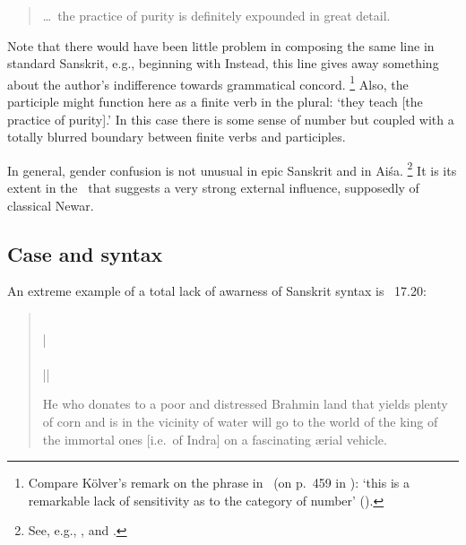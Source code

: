 \begin{quote}

\dots\ the practice of purity is definitely expounded in great detail.
\end{quote}

\noindent
Note that there would have been little problem in composing the same
line in standard Sanskrit, e.g., beginning with 
Instead, this line gives away something about the author's indifference
towards grammatical concord.%
		\footnote{Compare Kölver's remark on the phrase 
		in \SvayP\ (on p.~459 in ):
		`this is a remarkable lack of sensitivity as to the category of number'
		().}
Also, the participle  might
function here as a finite verb in the plural: `they teach [the practice of purity].'
In this case there is some sense of number but coupled with a totally 
blurred boundary between finite verbs and participles.


In general, gender confusion is not unusual in epic Sanskrit and in Aiśa.%
		\footnote{See, e.g., , and
									.}
It is its extent in the \VSS\ that suggests a very strong external influence,
supposedly of classical Newar.									





\subsection{Case and syntax}

An extreme example of a total lack of awarness of Sanskrit syntax is
\VSS~17.20:

\begin{quote}
\\
 |\\
\\
 ||

        He who donates to a poor and distressed Brahmin land 
        that yields plenty of corn and is in the vicinity of water
        will go to the world of the king of the immortal ones [i.e.\ of Indra]
		 on a fascinating \ae rial vehicle.
\end{quote}            
            
